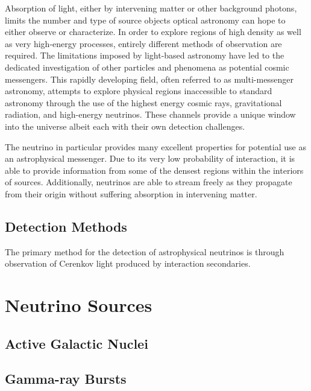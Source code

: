 \documentclass{gatech-thesis}
\begin{document}
Absorption of light, either by intervening matter or other background photons, limits the number and type of source objects optical astronomy can hope to either observe or characterize. In order to explore regions of high density as well as very high-energy processes, entirely different methods of observation are required. The limitations imposed by light-based astronomy have led to the dedicated investigation of other particles and phenomena as potential cosmic messengers. This rapidly developing field, often referred to as multi-messenger astronomy, attempts to explore physical regions inaccessible to standard astronomy through the use of the highest energy cosmic rays, gravitational radiation, and high-energy neutrinos. These channels provide a unique window into the universe albeit each with their own detection challenges.

The neutrino in particular provides many excellent properties for potential use as an astrophysical messenger. Due to its very low probability of interaction, it is able to provide information from some of the densest regions within the interiors of sources. Additionally, neutrinos are able to stream freely as they propagate from their origin without suffering absorption in intervening matter.

\section{Detection Methods}

The primary method for the detection of astrophysical neutrinos is through observation of Cerenkov light produced by interaction secondaries. 

\chapter{Neutrino Sources}


\section{Active Galactic Nuclei}

\section{Gamma-ray Bursts}

\end{document}
